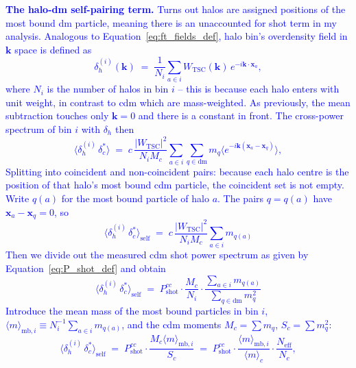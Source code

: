 \documentclass{article}
\begin{document}
\textcolor{blue}{\textbf{The halo-dm self-pairing term.} Turns out halos are assigned positions of the most bound dm particle, meaning there is an unaccounted for shot term in my analysis. 
Analogous to Equation~\ref{eq:ft_fields_def}, halo bin's overdensity field in $\mathbf{k}$ space is defined as
\begin{equation}
    \delta_h^{(i)}(\mathbf{k}) \;=\; \frac{1}{N_i}\sum_{a\in i}W_\mathrm{TSC}(\mathbf{k}) \, e^{-i \mathbf{k} \cdot \mathbf{x}_a},
    \label{eq:halo_field}
\end{equation}
where $N_i$ is the number of halos in bin $i$ -- this is because each halo enters with unit weight, in contrast to cdm which are mass-weighted. As previously, the mean subtraction touches only $\mathbf{k} =0$ and there is a constant in front. The cross-power spectrum of bin $i$ with $\delta_h$ then
\begin{equation}
    \langle \delta_h^{(i)} \, \delta_c^* \rangle \;=\; c \,\frac{|W_\mathrm{TSC}|^2}{N_iM_c} \sum_{a \in i}\sum_{q \in \mathrm{dm}} m_q\langle e^{-i \mathbf{k}(\mathbf{x}_a - \mathbf{x}_q)} \rangle,
\end{equation}
Splitting into coincident and non-coincident pairs: because each halo centre is the position of that halo's most bound cdm particle, the coincident set is not empty. Write $q(a)$ for the most bound particle of halo $a$. The pairs $q = q(a)$ have $\mathbf{x}_a - \mathbf{x}_q = 0$, so
\begin{equation}
    \langle \delta_h^{(i)} \, \delta_c^* \rangle_\mathrm{self} \;=\; c \,\frac{|W_\mathrm{TSC}|^2}{N_iM_c} \sum_{a \in i} m_{q(a)}
\end{equation}
Then we divide out the measured cdm shot power spectrum as given by Equation~\ref{eq:P_shot_def} and obtain
\begin{equation}
    \langle \delta_h^{(i)} \, \delta_c^* \rangle_\mathrm{self} \;=\;P^{cc}_\mathrm{shot} \cdot \frac{M_c}{N_i} \cdot \frac{\sum_{a \in i} m_{q(a)}}{\sum_{q \in \mathrm{dm}} m_q^2}
\end{equation}
Introduce the mean mass of the most bound particles in bin $i$, $\langle m \rangle_{\mathrm{mb}, i} \equiv N_i^{-1} \sum _{a \in i} m_{q(a)}$, and the cdm moments $M_c = \sum m_q$, $S_c = \sum m_q^2$:
\begin{equation}
    \langle \delta_h^{(i)} \, \delta_c^* \rangle_\mathrm{self} \;=\;P^{cc}_\mathrm{shot} \cdot \frac{M_c \langle m \rangle_{\mathrm{mb}, i}}{S_c}\;=\;P^{cc}_\mathrm{shot} \cdot \frac{\langle m \rangle_{\mathrm{mb}, i}}{\langle m \rangle_c} \cdot \frac{N_\mathrm{eff}}{N_c},

\end{equation}}
\end{document}

